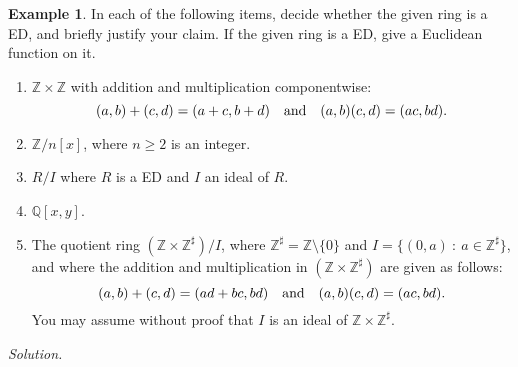 \documentclass[12pt]{article}
\newcommand{\qbox}[1]{\quad\hbox{#1}\quad}
\theoremstyle{definition}
\newtheorem{example}[thm]{Example}
\newcounter{ex}\renewcommand\theex{\arabic{ex}}
\newcommand{\Z}{\ensuremath{\mathbb{Z}}}
\newcommand{\Q}{\ensuremath{\mathbb{Q}}}
\begin{document}
\begin{example}
In each of the following items, decide whether the given ring is a
ED, and briefly justify your claim. If the given ring is a ED, give
a Euclidean function on it.
\begin{enumerate}
\item $\Z\times\Z$ with addition and multiplication componentwise:
$$(a,b)+(c,d)=(a+c,b+d)\qbox{and}(a,b)(c,d)=(ac,bd).$$
\item $\Z/n[x]$, where $n\geq2$ is an integer.
\item $R/I$ where $R$ is a ED and $I$ an ideal of $R$.
\item $\Q[x,y]$.
\item The quotient ring $(\Z\times\Z^\sharp)/I$, where
$\Z^\sharp=\Z\setminus\{0\}$ and $I=\{(0,a)~:~ a\in\Z^\sharp\}$, and
where the addition and multiplication in $(\Z\times\Z^\sharp)$ are
given as follows:
$$(a,b)+(c,d)=(ad+bc,bd)\qbox{and}(a,b)(c,d)=(ac,bd).$$
You may assume without proof that $I$ is an ideal of
$\Z\times\Z^\sharp$.
\end{enumerate}

{\em Solution.}


\end{example}
\end{document}

